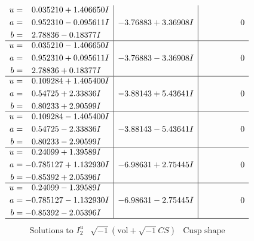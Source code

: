 \documentclass[1p]{elsarticle_modified}
\theoremstyle{definition}
\newcommand{\I}{\sqrt{-1}}
\begin{document}
$$\begin{array}{c|c|c}
\begin{aligned}
u &= \phantom{-}0.035210 + 1.406650 I \\
a &= \phantom{-}0.952310 - 0.095611 I \\
b &= \phantom{-}2.78836 - 0.18377 I\end{aligned}
 & -3.76883 + 3.36908 I & \phantom{-0.000000 } 0 \\ \hline\begin{aligned}
u &= \phantom{-}0.035210 - 1.406650 I \\
a &= \phantom{-}0.952310 + 0.095611 I \\
b &= \phantom{-}2.78836 + 0.18377 I\end{aligned}
 & -3.76883 - 3.36908 I & \phantom{-0.000000 } 0 \\ \hline\begin{aligned}
u &= \phantom{-}0.109284 + 1.405400 I \\
a &= \phantom{-}0.54725 + 2.33836 I \\
b &= \phantom{-}0.80233 + 2.90599 I\end{aligned}
 & -3.88143 + 5.43641 I & \phantom{-0.000000 } 0 \\ \hline\begin{aligned}
u &= \phantom{-}0.109284 - 1.405400 I \\
a &= \phantom{-}0.54725 - 2.33836 I \\
b &= \phantom{-}0.80233 - 2.90599 I\end{aligned}
 & -3.88143 - 5.43641 I & \phantom{-0.000000 } 0 \\ \hline\begin{aligned}
u &= \phantom{-}0.24099 + 1.39589 I \\
a &= -0.785127 + 1.132930 I \\
b &= -0.85392 + 2.05396 I\end{aligned}
 & -6.98631 + 2.75445 I & \phantom{-0.000000 } 0 \\ \hline\begin{aligned}
u &= \phantom{-}0.24099 - 1.39589 I \\
a &= -0.785127 - 1.132930 I \\
b &= -0.85392 - 2.05396 I\end{aligned}
 & -6.98631 - 2.75445 I & \phantom{-0.000000 } 0\\
 \hline 
 \end{array}$$\newpage$$\begin{array}{c|c|c}  
\text{Solutions to }I^u_{2}& \I (\text{vol} + \sqrt{-1}CS) & \text{Cusp shape}\\
 \hline 
\begin{aligned}

\end{aligned}
\end{array}$$
\end{document}

